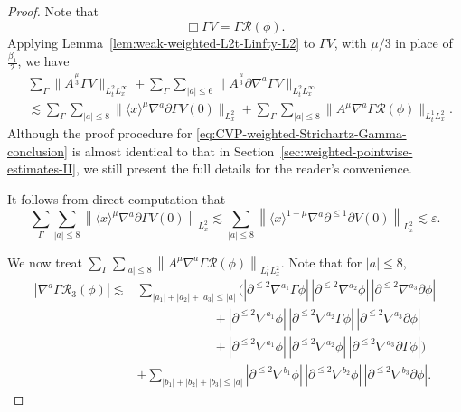 \documentclass[11pt,twoside]{article}
\def\ds{\displaystyle}
\def\f{\frac}
\def\p{\partial}
\def\ve{\varepsilon}
\def\ls{\lesssim}
\theoremstyle{plain}
\theoremstyle{definition}
\theoremstyle{assumption}
\numberwithin{equation}{section}
\begin{document}
	\begin{proof}
		Note that
		\begin{equation}\label{eq:CVP-Gamma-V-equation-Strichartz}
			\Box\Gamma V
			=\Gamma\mathcal R(\phi).
			\end{equation}
		Applying Lemma~\ref{lem:weak-weighted-L2t-Linfty-L2} to \(\Gamma V\), with
		\(\mu/3\) in place of \(\f{\beta_1}2\), we have
		\begin{equation}
			\label{eq:CVP-Gamma-V-linear-Strichartz}
			\begin{aligned}
				&\sum_{\Gamma}
				\big\|
				A^{\frac{\mu}{3}}\Gamma V
				\big\|_{L^2_{t}L^\infty_x}
				+\sum_{\Gamma}
				\sum_{|a|\le 6}
				\big\|
				A^{\frac{\mu}{3}}
				\p\nabla^a\Gamma V
				\big\|_{L^2_{t}L^\infty_x}
				\\
				&\ls
				\sum_{\Gamma}
				\sum_{|a|\le 8}
				\big\|
				\langle x\rangle^{\mu}
				\nabla^a\p\Gamma V(0)
				\big\|_{L^2_x}
				+
				\sum_{\Gamma}
				\sum_{|a|\le 8}
				\big\|
				A^{\mu}
				\nabla^a\Gamma\mathcal R(\phi)
				\big\|_{L^1_tL^2_x}.
			\end{aligned}
		\end{equation}
		Although the proof procedure for \eqref{eq:CVP-weighted-Strichartz-Gamma-conclusion} is almost identical to that in Section~\ref{sec:weighted-pointwise-estimates-II}, we still present the full details for the reader's convenience.
		
		It follows from direct computation that
		\begin{equation}\label{eq:CVP-Gamma-V-initial-Strichartz}
			\sum_{\Gamma}
			\sum_{|a|\le 8}
			\left\|
			\langle x\rangle^{\mu}
			\nabla^a\p\Gamma V(0)
			\right\|_{L^2_x}
			\ls
			\sum_{|a|\le 8}
			\left\|
			\langle x\rangle^{1+\mu}
			\nabla^a\p^{\le 1}\p V(0)
			\right\|_{L^2_x}
			\ls
			\ve.
		\end{equation}
		
		We now treat  $\ds\sum_{\Gamma}\sum_{|a|\le 8}
		\left\|
		A^{\mu}
		\nabla^a\Gamma\mathcal R(\phi)
		\right\|_{L^1_tL^2_x}$.
		Note that for \(|a|\le 8\),
		\begin{equation}
			\label{eq:CVP-Gamma-R3-schematic-Leibniz-III}
			\begin{aligned}
				|\nabla^a\Gamma\mathcal R_3(\phi)|
				\ls
				&\sum_{|a_1|+|a_2|+|a_3|\le |a|}
				\Big(
				|\p^{\le2}\nabla^{a_1}\Gamma\phi|\,
				|\p^{\le2}\nabla^{a_2}\phi|\,
				|\p^{\le2}\nabla^{a_3}\p\phi|
				\\
				&\qquad\qquad\qquad +
				|\p^{\le2}\nabla^{a_1}\phi|\,
				|\p^{\le2}\nabla^{a_2}\Gamma\phi|\,
				|\p^{\le2}\nabla^{a_3}\p\phi|
				\\
				&\qquad\qquad\qquad +
				|\p^{\le2}\nabla^{a_1}\phi|\,
				|\p^{\le2}\nabla^{a_2}\phi|\,
				|\p^{\le2}\nabla^{a_3}\p\Gamma\phi|
				\Big)
				\\
				&+
				\sum_{|b_1|+|b_2|+|b_3|\le |a|}
				|\p^{\le2}\nabla^{b_1}\phi|\,
				|\p^{\le2}\nabla^{b_2}\phi|\,
				|\p^{\le2}\nabla^{b_3}\p\phi|.
			\end{aligned}
		\end{equation}
		

\end{proof}
\end{document}

